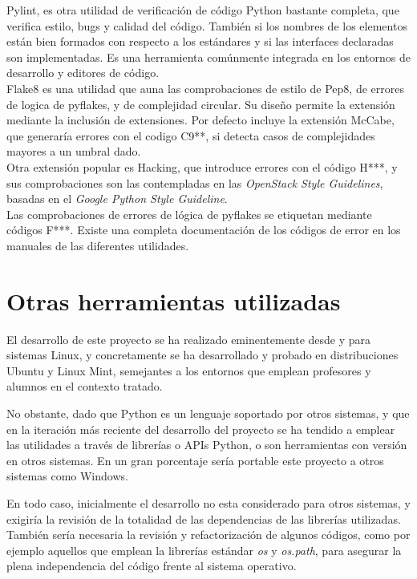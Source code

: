 Pylint, es otra utilidad de verificación de código Python bastante completa, que verifica estilo, bugs y calidad del código. También si los nombres de los elementos están bien formados con respecto a los estándares y si las interfaces declaradas son implementadas. Es una herramienta comúnmente integrada en los entornos de desarrollo y editores de código.\\


Flake8 es una utilidad que auna las comprobaciones de estilo de Pep8, de errores de logica de pyflakes, y de complejidad circular. Su diseño permite la extensión mediante la inclusión de extensiones.  Por defecto incluye la extensión McCabe, que generaría errores con el codigo C9**, si detecta casos de complejidades mayores a un umbral dado.\\


Otra extensión popular es Hacking, que introduce errores con el código H***, y sus comprobaciones son las contempladas en las \textit{OpenStack Style Guidelines}, basadas en el \textit{Google Python Style Guideline}.\\

Las comprobaciones de errores de lógica de pyflakes se etiquetan mediante códigos F***. Existe una completa documentación de los códigos de error en los manuales de las diferentes utilidades.\\


\section{Otras herramientas utilizadas} 
\label{sec:otras_herramientas}

El desarrollo de este proyecto se ha realizado eminentemente desde y para sistemas Linux, y concretamente se ha desarrollado y probado en distribuciones Ubuntu y Linux Mint, semejantes a los entornos que emplean profesores y alumnos en el contexto tratado.

No obstante, dado que Python es un lenguaje soportado por otros sistemas, y que en la iteración más reciente del desarrollo del proyecto se ha tendido a emplear las utilidades a través de librerías o APIs Python, o son herramientas con versión en otros sistemas. En un gran porcentaje sería portable este proyecto a otros sistemas como Windows.

En todo caso, inicialmente el desarrollo no esta considerado para otros sistemas, y exigiría la revisión de la totalidad de las dependencias de las librerías utilizadas. También sería necesaria la revisión y refactorización de algunos códigos, como por ejemplo  aquellos que emplean la librerías estándar \textit{os} y \textit{os.path}, para asegurar la plena independencia del código frente al sistema operativo.\\


